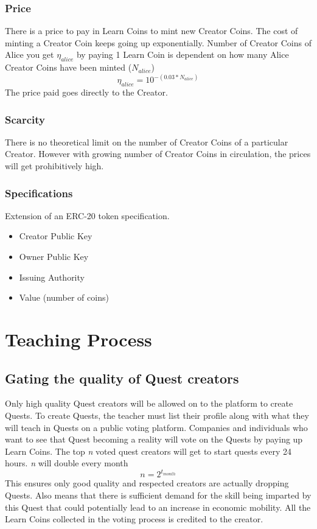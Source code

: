 \documentclass{article}
\begin{document}
      \subsubsection{Price}
        There is a price to pay in Learn Coins to mint new Creator Coins. The cost of minting a Creator Coin keeps going up exponentially.
        Number of Creator Coins of Alice you get \(\eta_{alice}\) by paying 1 Learn Coin is dependent on how many Alice Creator Coins have been minted (\(N_{alice}\)) 
        \[
          \eta_{alice} = 10^{-(0.03 * N_{alice})}
        \]
        The price paid goes directly to the Creator.
      \subsubsection{Scarcity}
        There is no theoretical limit on the number of Creator Coins of a particular Creator. However with growing number of Creator Coins in circulation, the prices will get prohibitively high.
      \subsubsection{Specifications}
        Extension of an ERC-20 token specification.
        \begin{itemize}
          \item Creator Public Key
          \item Owner Public Key
          \item Issuing Authority
          \item Value (number of coins)
        \end{itemize}

      
  \section{Teaching Process}
    \subsection{Gating the quality of Quest creators}
      Only high quality Quest creators will be allowed on to the platform to create Quests. To create Quests, the teacher must list their profile along with what they will teach in Quests on a public voting platform.
      Companies and individuals who want to see that Quest becoming a reality will vote on the Quests by paying up Learn Coins. The top \textit{n} voted quest creators will get to start quests every 24 hours. \textit{n} will double every month
      \[
        n = 2^{t_{month}}
      \]
      This ensures only good quality and respected creators are actually dropping Quests. Also means that there is sufficient demand for the skill being imparted by this Quest that could potentially lead to an increase in economic mobility.
      All the Learn Coins collected in the voting process is credited to the creator.
\end{document}
